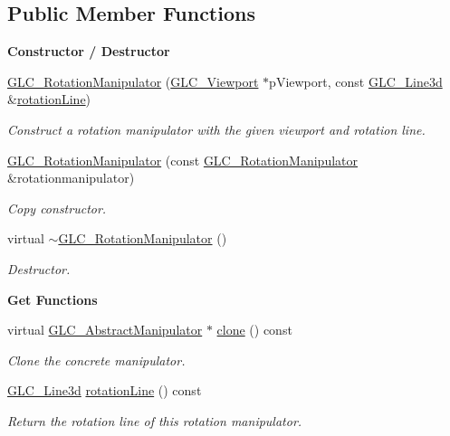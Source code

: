 \subsection*{Public Member Functions}
\begin{Indent}{\bf Constructor / Destructor}\par
\begin{DoxyCompactItemize}
\item 
\hyperlink{class_g_l_c___rotation_manipulator_abf7c5514bb47e5d1dc37b5c6036a1d4d}{G\-L\-C\-\_\-\-Rotation\-Manipulator} (\hyperlink{class_g_l_c___viewport}{G\-L\-C\-\_\-\-Viewport} $\ast$p\-Viewport, const \hyperlink{class_g_l_c___line3d}{G\-L\-C\-\_\-\-Line3d} \&\hyperlink{class_g_l_c___rotation_manipulator_aa3bee728b3c26a9232f2fff823e18ec1}{rotation\-Line})
\begin{DoxyCompactList}\small\item\em Construct a rotation manipulator with the given viewport and rotation line. \end{DoxyCompactList}\item 
\hyperlink{class_g_l_c___rotation_manipulator_a7f5d5702476f6e18c854a130573b6878}{G\-L\-C\-\_\-\-Rotation\-Manipulator} (const \hyperlink{class_g_l_c___rotation_manipulator}{G\-L\-C\-\_\-\-Rotation\-Manipulator} \&rotationmanipulator)
\begin{DoxyCompactList}\small\item\em Copy constructor. \end{DoxyCompactList}\item 
virtual \hyperlink{class_g_l_c___rotation_manipulator_a1bc5d26d44fd905db09be32ac41c19bc}{$\sim$\-G\-L\-C\-\_\-\-Rotation\-Manipulator} ()
\begin{DoxyCompactList}\small\item\em Destructor. \end{DoxyCompactList}\end{DoxyCompactItemize}
\end{Indent}
\begin{Indent}{\bf Get Functions}\par
\begin{DoxyCompactItemize}
\item 
virtual \hyperlink{class_g_l_c___abstract_manipulator}{G\-L\-C\-\_\-\-Abstract\-Manipulator} $\ast$ \hyperlink{class_g_l_c___rotation_manipulator_a19f787f9e5bea5e8ee007621cea6c793}{clone} () const 
\begin{DoxyCompactList}\small\item\em Clone the concrete manipulator. \end{DoxyCompactList}\item 
\hyperlink{class_g_l_c___line3d}{G\-L\-C\-\_\-\-Line3d} \hyperlink{class_g_l_c___rotation_manipulator_aa3bee728b3c26a9232f2fff823e18ec1}{rotation\-Line} () const 
\begin{DoxyCompactList}\small\item\em Return the rotation line of this rotation manipulator. \end{DoxyCompactList}\end{DoxyCompactItemize}
\end{Indent}
